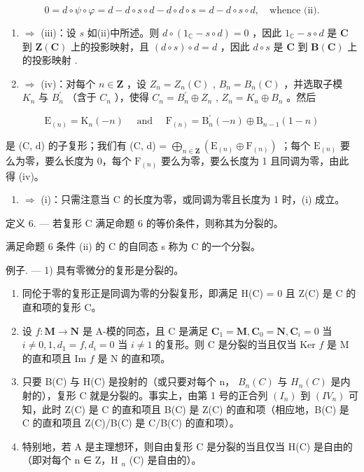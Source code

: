 \[
0 = d \circ \psi \circ \varphi = d - d \circ s \circ d - d \circ d \circ s = d - d \circ s \circ d, \quad \text {whence (ii)}.
\]

\begin{enumerate}
\def\labelenumi{(\roman{enumi})}
\setcounter{enumi}{1}
\item
  \(\Rightarrow\) (iii)：设 \(s\) 如(ii)中所述。则 \(d \circ (1_{\mathbb{C}} - s \circ d) = 0\) ，因此 \(1_{\mathbb{C}} - s \circ d\) 是 \(\mathbf{C}\) 到 \(\mathbf{Z}(\mathbf{C})\) 上的投影映射，且 \((d \circ s) \circ d = d\) ，因此 \(d \circ s\) 是 \(\mathbf{C}\) 到 \(\mathbf{B}(\mathbf{C})\) 上的投影映射 .
\item
  \(\Rightarrow\) (iv)：对每个 \(n\in\mathbf{Z}\) ，设 \(Z_{n}=Z_{n}(\mathrm{C})\) , \(B_{n}=B_{n}(\mathrm{C})\) ，并选取子模 \(K_{n}\) 与 \(B_{n}^{\prime}\) （含于 \(C_{n}\) ），使得 \(C_{n}=B_{n}^{\prime}\oplus Z_{n}\) , \(Z_{n}=K_{n}\oplus B_{n}\) 。然后
\end{enumerate}

\[
\mathrm{E} _ {(n)} = \mathrm{K} _ {n} (- n) \quad \text { and } \quad \mathrm{F} _ {(n)} = \mathrm{B} _ {n} ^ {\prime} (- n) \oplus \mathrm{B} _ {n - 1} (1 - n)
\]

是 (C, d) 的子复形；我们有 (C, d) = \(\bigoplus_{n \in \mathbf{Z}} (\mathrm{E}_{(n)} \oplus \mathrm{F}_{(n)})\) ；每个 \(\mathrm{E}_{(n)}\) 要么为零，要么长度为 0，每个 \(\mathrm{F}_{(n)}\) 要么为零，要么长度为 1 且同调为零，由此得 (iv)。

\begin{enumerate}
\def\labelenumi{(\roman{enumi})}
\setcounter{enumi}{3}
\tightlist
\item
  \(\Rightarrow\) (i)：只需注意当 C 的长度为零，或同调为零且长度为 1 时，(i) 成立。
\end{enumerate}

定义 6. --- 若复形 C 满足命题 6 的等价条件，则称其为分裂的。

满足命题 6 条件 (ii) 的 C 的自同态 s 称为 C 的一个分裂。

例子. --- 1) 具有零微分的复形是分裂的。

\begin{enumerate}
\def\labelenumi{\arabic{enumi})}
\setcounter{enumi}{1}
\item
  同伦于零的复形正是同调为零的分裂复形，即满足 H(C) = 0 且 Z(C) 是 C 的直和项的复形 C。
\item
  设 \(f: \mathbf{M} \to \mathbf{N}\) 是 A-模的同态，且 C 是满足 \(\mathbf{C}_1 = \mathbf{M}, \mathbf{C}_0 = \mathbf{N}, \mathbf{C}_i = 0\) 当 \(i \neq 0, 1, d_1 = f, d_i = 0\) 当 \(i \neq 1\) 的复形。则 C 是分裂的当且仅当 Ker \(f\) 是 M 的直和项且 Im \(f\) 是 N 的直和项。
\item
  只要 B(C) 与 H(C) 是投射的（或只要对每个 n， \(B_{n}(C)\) 与 \(H_{n}(C)\) 是内射的），复形 C 就是分裂的。事实上，由第 1 号的正合列 \((I_{n})\) 到 \((IV_{n})\) 可知，此时 Z(C) 是 C 的直和项且 B(C) 是 Z(C) 的直和项（相应地，B(C) 是 C 的直和项且 Z(C)/B(C) 是 C/B(C) 的直和项）。
\item
  特别地，若 A 是主理想环，则自由复形 C 是分裂的当且仅当 H(C) 是自由的（即对每个 n ∈ Z，H \(_{n}\) (C) 是自由的）。
\end{enumerate}

